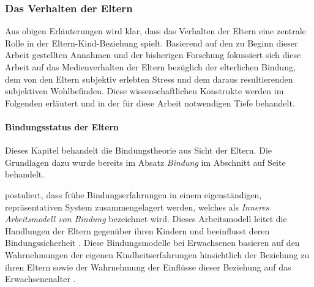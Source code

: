 \subsubsection{Das Verhalten der Eltern}\label{sec:Medienverhalten}
Aus obigen Erläuterungen wird klar, dass das Verhalten der Eltern eine zentrale Rolle in der Eltern-Kind-Beziehung spielt. Basierend auf den zu Beginn dieser Arbeit gestellten Annahmen und der bisherigen Forschung fokussiert sich diese Arbeit auf das Medienverhalten der Eltern bezüglich der elterlichen Bindung, dem von den Eltern subjektiv erlebten Stress und dem daraus resultierenden subjektiven Wohlbefinden. Diese wissenschaftlichen Konstrukte werden im Folgenden erläutert und in der für diese Arbeit notwendigen Tiefe behandelt.

\paragraph{Bindungsstatus der Eltern}\label{sec:Bindungsstatus}
Dieses Kapitel behandelt die Bindungstheorie aus Sicht der Eltern. Die Grundlagen dazu wurde bereits im Absatz \textit{Bindung} im Abschnitt \textit{} auf Seite \pageref{sec:Entwicklungsaufgaben} behandelt.

 postuliert, dass frühe Bindungserfahrungen in einem eigenständigen, repräsentativen System zusammengelagert werden, welches als \textit{Inneres Arbeitsmodell von Bindung} bezeichnet wird. Dieses Arbeitsmodell leitet die Handlungen der Eltern gegenüber ihren Kindern und beeinflusst deren Bindungssicherheit \cite{Siegler2008}. Diese Bindungsmodelle bei Erwachsenen basieren auf den Wahrnehmungen der eigenen Kindheitserfahrungen hinsichtlich der Beziehung zu ihren Eltern sowie der Wahrnehmung der Einflüsse dieser Beziehung auf das Erwachsenenalter \cite{Main1985}.

